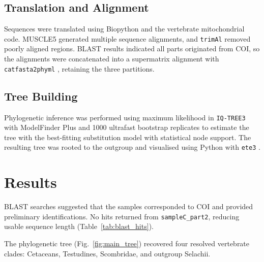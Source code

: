 \documentclass[11pt]{article}
\begin{document}
\subsection*{Translation and Alignment}
Sequences were translated using Biopython \citep{biopython} and the vertebrate mitochondrial code. MUSCLE5 \citep{muscle5} generated multiple sequence alignments, and \texttt{trimAl} \citep{trimal} removed poorly aligned regions. BLAST results indicated all parts originated from COI, so the alignments were concatenated into a supermatrix alignment with \texttt{catfasta2phyml} \citep{catfasta}, retaining the three partitions.

\subsection*{Tree Building}
Phylogenetic inference was performed using maximum likelihood in \texttt{IQ-TREE3} \citep{iqtree} with ModelFinder Plus and 1000 ultrafast bootstrap replicates to estimate the tree with the best-fitting substitution model with statistical node support. The resulting tree was rooted to the outgroup and visualised using Python with \texttt{ete3} \citep{huerta2016ete}.

\section*{Results} %
BLAST searches suggested that the samples corresponded to COI and provided preliminary identifications. No hits returned from \texttt{sampleC\_part2}, reducing usable sequence length (Table~\ref{tab:blast_hits}).
\par The phylogenetic tree (Fig.~\ref{fig:main_tree}) recovered four resolved vertebrate clades: Cetaceans, Testudines, Scombridae, and outgroup Selachii.
\end{document}
